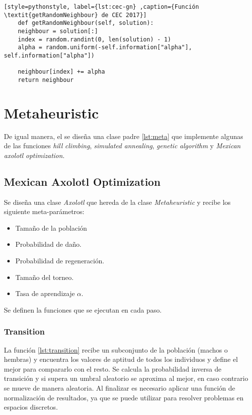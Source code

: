 \begin{lstlisting}[style=pythonstyle, label={lst:cec-gn} ,caption={Función \textit{getRandomNeighbour} de CEC 2017}]
	def getRandomNeighbour(self, solution):
	neighbour = solution[:]
	index = random.randint(0, len(solution) - 1)
	alpha = random.uniform(-self.information["alpha"], self.information["alpha"])
	
	neighbour[index] += alpha
	return neighbour
\end{lstlisting}

\section{Metaheuristic}

De igual manera, el se diseña una clase padre \ref{lst:meta} que implemente algunas de las funciones \textit{hill climbing}, \textit{simulated annealing}, \textit{genetic algorithm} y \textit{Mexican axolotl optimization}.

\subsection{Mexican Axolotl Optimization}

Se diseña una clase \textit{Axolotl} que hereda de la clase \textit{Metaheuristic} y recibe los siguiente meta-parámetros:
\begin{itemize}
	\item Tamaño de la población
	\item Probabilidad de daño.
	\item Probabilidad de regeneración.
	\item Tamaño del torneo.
	\item Tasa de aprendizaje $\alpha$.
\end{itemize}

Se definen la funciones que se ejecutan en cada paso.

\subsubsection{Transition}

La función \ref{lst:transition} recibe un subconjunto de la población (machos o hembras) y encuentra los valores de aptitud de todos los individuos y define el mejor para compararlo con el resto. Se calcula la probabilidad inversa de transición y si supera un umbral aleatorio se aproxima al mejor, en caso contrario se mueve de manera aleatoria. Al finalizar es necesario aplicar una función de normalización de resultados, ya que se puede utilizar para resolver problemas en espacios discretos.


